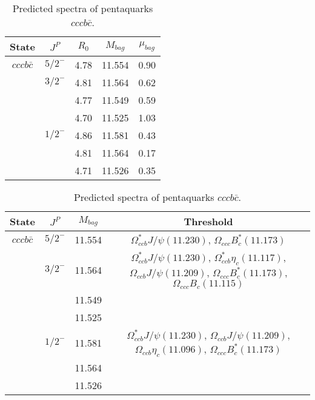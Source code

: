 \documentclass[prd,twocolumn,floatfix,nofootinbib]{revtex4}
\begin{document}
\renewcommand{\tabcolsep}{0.5cm}
\renewcommand{\arraystretch}{1.2}
\begin{table*}[!htbp]
    \caption{Predicted spectra of pentaquarks $cccb\bar{c}$.}
    \begin{tabular}{ccccc}
        \hline\hline
        {\rm State} &$J^{P}$ &$R_{0}$ &$M_{bag}$ &$\mu_{bag}$ \\ \hline
        ${cccb\bar{c}}$
        &${5/2}^{-}$    &4.78   &11.554 &0.90 \\
        &${3/2}^{-}$    &4.81   &11.564 &0.62 \\
        &               &4.77   &11.549 &0.59 \\
        &               &4.70   &11.525 &1.03 \\
        &${1/2}^{-}$    &4.86   &11.581 &0.43 \\
        &               &4.81   &11.564 &0.17 \\
        &               &4.71   &11.526 &0.35 \\
        \hline\hline
    \end{tabular}
\end{table*}

\renewcommand{\tabcolsep}{0.5cm}
\renewcommand{\arraystretch}{1.2}
\begin{table*}[!htbp]
    \caption{Predicted spectra of pentaquarks $cccb\bar{c}$.}
    \begin{tabular}{cccc}
        \hline\hline
        {\rm State} &$J^{P}$ &$M_{bag}$ &Threshold \\ \hline
        ${cccb\bar{c}}$
        &${5/2}^{-}$    &11.554 &$\Omega^{\ast}_{ccb} J/\psi(11.230)$, $\Omega_{ccc} B^{\ast}_{c}(11.173)$ \\
        &${3/2}^{-}$    &11.564 &$\Omega^{\ast}_{ccb} J/\psi(11.230)$, $\Omega^{\ast}_{ccb} \eta_{c}(11.117)$, $\Omega_{ccb} J/\psi(11.209)$, $\Omega_{ccc} B^{\ast}_{c}(11.173)$, $\Omega_{ccc} B_{c}(11.115)$ \\
        &               &11.549 & \\
        &               &11.525 & \\
        &${1/2}^{-}$    &11.581 &$\Omega^{\ast}_{ccb} J/\psi(11.230)$, $\Omega_{ccb} J/\psi(11.209)$, $\Omega_{ccb} \eta_{c}(11.096)$, $\Omega_{ccc} B^{\ast}_{c}(11.173)$ \\
        &               &11.564 & \\
        &               &11.526 & \\
        \hline\hline
    \end{tabular}
\end{table*}
\end{document}
